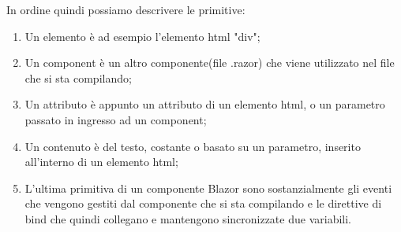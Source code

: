In ordine quindi possiamo descrivere le primitive:
\begin{enumerate}
	\item Un elemento \`e ad esempio l'elemento html "div";
	\item Un component \`e un altro componente(file .razor) che viene utilizzato nel file che si sta compilando;
	\item Un attributo \`e appunto un attributo di un elemento html, o un parametro passato in ingresso ad un component;
	\item Un contenuto \`e del testo, costante o basato su un parametro, inserito all'interno di un elemento html;
	\item L'ultima primitiva di un componente Blazor sono sostanzialmente gli eventi che vengono gestiti dal componente che si sta compilando e le direttive di bind che quindi collegano e mantengono sincronizzate due variabili.
\end{enumerate}

\pagebreak